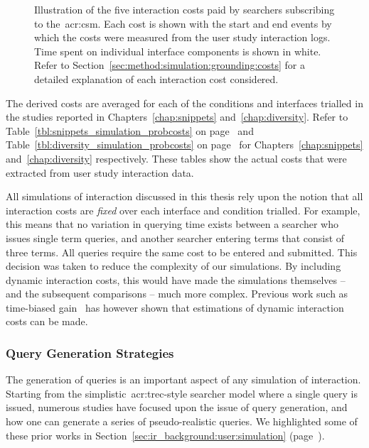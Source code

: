 \begin{figure}[t!]
    \centering
    \caption[Interaction costs illustrated throughout a search session]{Illustration of the five interaction costs paid by searchers subscribing to the~\gls{acr:csm}. Each cost is shown with the start and end events by which the costs were measured from the user study interaction logs. Time spent on individual interface components is shown in white. Refer to Section~\ref{sec:method:simulation:grounding:costs} for a detailed explanation of each interaction cost considered.}
    \label{fig:costs}
\end{figure}

The derived costs are averaged for each of the conditions and interfaces trialled in the studies reported in Chapters~\ref{chap:snippets} and~\ref{chap:diversity}. Refer to Table~\ref{tbl:snippets_simulation_probcosts} on page~\pageref{tbl:snippets_simulation_probcosts} and Table~\ref{tbl:diversity_simulation_probcosts} on page~\pageref{tbl:diversity_simulation_probcosts} for Chapters~\ref{chap:snippets} and~\ref{chap:diversity} respectively. These tables show the actual costs that were extracted from user study interaction data.

All simulations of interaction discussed in this thesis rely upon the notion that all interaction costs are \emph{fixed} over each interface and condition trialled. For example, this means that no variation in querying time exists between a searcher who issues single term queries, and another searcher entering terms that consist of three terms. All queries require the same cost to be entered and submitted. This decision was taken to reduce the complexity of our simulations. By including dynamic interaction costs, this would have made the simulations themselves -- and the subsequent comparisons -- much more complex. Previous work such as time-biased gain~\citep{smucker2012tbg} has however shown that estimations of dynamic interaction costs can be made.

\subsubsection{Query Generation Strategies}\label{sec:method:simulation:grounding:querying}
The generation of queries is an important aspect of any simulation of interaction. Starting from the simplistic~\gls{acr:trec}-style searcher model where a single query is issued, numerous studies have focused upon the issue of query generation, and how one can generate a series of pseudo-realistic queries. We highlighted some of these prior works in Section~\ref{sec:ir_background:user:simulation} (page~\pageref{sec:ir_background:user:simulation}).

